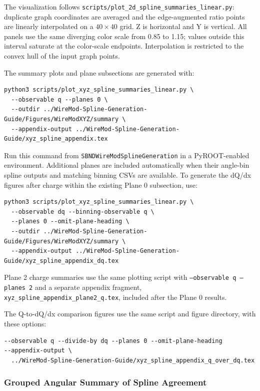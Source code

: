 \documentclass{article}
\begin{document}
\begin{appendices}
The visualization follows \texttt{scripts/plot\_2d\_spline\_summaries\_linear.py}: duplicate graph coordinates are averaged and the edge-augmented ratio points are linearly interpolated on a $40\times40$ grid. Z is horizontal and Y is vertical. All panels use the same diverging color scale from 0.85 to 1.15; values outside this interval saturate at the color-scale endpoints. Interpolation is restricted to the convex hull of the input graph points.

The summary plots and plane subsections are generated with:
\begin{verbatim}
python3 scripts/plot_xyz_spline_summaries_linear.py \
  --observable q --planes 0 \
  --outdir ../WireMod-Spline-Generation-Guide/Figures/WireModXYZ/summary \
  --appendix-output ../WireMod-Spline-Generation-Guide/xyz_spline_appendix.tex
\end{verbatim}
Run this command from \texttt{SBNDWireModSplineGeneration} in a PyROOT-enabled environment. Additional planes are included automatically when their angle-bin spline outputs and matching binning CSVs are available. To generate the dQ/dx figures after charge within the existing Plane 0 subsection, use:
\begin{verbatim}
python3 scripts/plot_xyz_spline_summaries_linear.py \
  --observable dq --binning-observable q \
  --planes 0 --omit-plane-heading \
  --outdir ../WireMod-Spline-Generation-Guide/Figures/WireModXYZ/summary \
  --appendix-output ../WireMod-Spline-Generation-Guide/xyz_spline_appendix_dq.tex
\end{verbatim}

Plane 2 charge summaries use the same plotting script with \texttt{--observable q --planes 2} and a separate appendix fragment, \texttt{xyz\_spline\_appendix\_plane2\_q.tex}, included after the Plane 0 results.

The Q-to-dQ/dx comparison figures use the same script and figure directory,
with these options:
\begin{verbatim}
--observable q --divide-by dq --planes 0 --omit-plane-heading
--appendix-output \
  ../WireMod-Spline-Generation-Guide/xyz_spline_appendix_q_over_dq.tex
\end{verbatim}




\clearpage
\subsubsection{Grouped Angular Summary of Spline Agreement}
\label{sec:plane0_grouped_spline_agreement}


\end{appendices}
\end{document}
